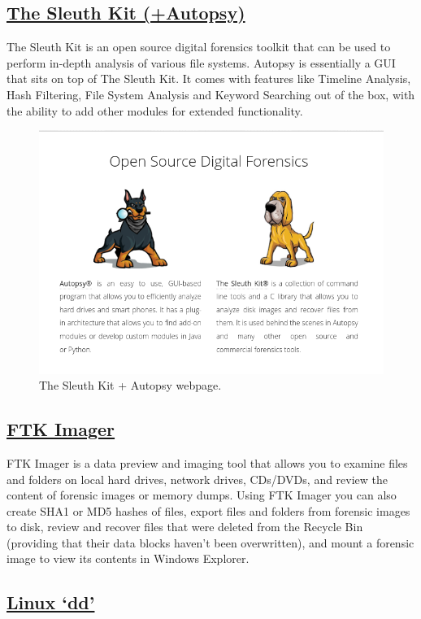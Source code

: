 \documentclass[11pt]{article}
\begin{document}
\subsection{\href{https://www.sleuthkit.org/index.php}{The Sleuth Kit (+Autopsy)}}

The Sleuth Kit is an open source digital forensics toolkit that can be used to perform in-depth analysis of various file systems. Autopsy is essentially a GUI that sits on top of The Sleuth Kit. It comes with features like Timeline Analysis, Hash Filtering, File System Analysis and Keyword Searching out of the box, with the ability to add other modules for extended functionality.

\begin{figure}[H]
    \centering
    \includegraphics[width=.85\textwidth]{./slueth.png}
    \caption{The Sleuth Kit + Autopsy webpage. }
\end{figure}

\subsection{\href{https://www.exterro.com/ftk-imager}{FTK Imager}}

FTK Imager is a data preview and imaging tool that allows you to examine files and folders on local hard drives, network drives, CDs/DVDs, and review the content of forensic images or memory dumps. Using FTK Imager you can also create SHA1 or MD5 hashes of files, export files and folders from forensic images to disk, review and recover files that were deleted from the Recycle Bin (providing that their data blocks haven’t been overwritten), and mount a forensic image to view its contents in Windows Explorer.

\subsection{\href{https://www.geeksforgeeks.org/dd-command-linux/}{Linux ‘dd’}}
\end{document}
